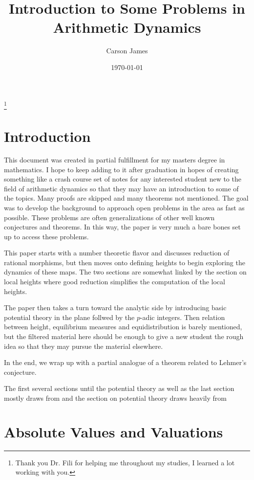 \documentclass{amsart}
\title[Creative Component]{Introduction to Some Problems in Arithmetic Dynamics}
\author[James]{Carson James}
\date{\today}
\begin{document}
\maketitle
\newpage
\thanks{Thank you Dr. Fili for helping me throughout my studies, I learned a lot working with you.}

\tableofcontents

\section{Introduction}
This document was created in partial fulfillment for my masters degree in mathematics. I hope to keep adding to it after graduation in hopes of creating something like a crash course set of notes for any interested student new to the field of arithmetic dynamics so that they may have an introduction to some of the topics. Many proofs are skipped and many theorems not mentioned. The goal was to develop the background to approach open problems in the area as fast as possible. These problems are often generalizations of other well known conjectures and theorems. In this way, the paper is very much a bare bones set up to access these problems.

This paper starts with a number theoretic flavor and discusses reduction of rational morphisms, but then moves onto defining heights to begin exploring the dynamics of these maps. The two sections are somewhat linked by the section on local heights where good reduction simplifies the computation of the local heights.

The paper then takes a turn toward the analytic side by introducing basic potential theory in the plane follwed by the $p$-adic integers. Then relation between height, equilibrium measures and equidistribution is barely mentioned, but the filtered material here should be enough to give a new student the rough idea so that they may pursue the material elsewhere.

In the end, we wrap up with a partial analogue of a theorem related to Lehmer's conjecture.

The first several sections until the potential theory as well as the last section mostly draws from \cite{ADS}
and the section on potential theory draws heavily from \cite{PT}



\section{Absolute Values and Valuations}
\end{document}
